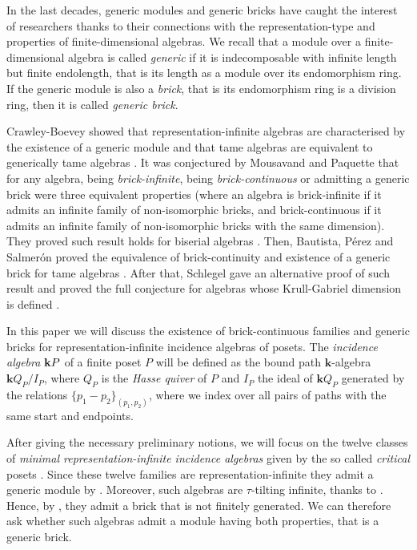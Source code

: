 In the last decades, generic modules and generic bricks have caught the interest of researchers thanks to their connections with the representation-type and properties of finite-dimensional algebras. We recall that a module over a finite-dimensional algebra is called \emph{generic} if it is indecomposable with infinite length but finite endolength, that is its length as a module over its endomorphism ring. If the generic module is also a \emph{brick}, that is its endomorphism ring is a division ring, then it is called \emph{generic brick}.

Crawley-Boevey showed that representation-infinite algebras are characterised by the existence of a generic module \cite[Theorem 4.5]{crawley1991tame} and that tame algebras are equivalent to generically tame algebras \cite[Theorem 4.4]{crawley1991tame}.
It was conjectured by Mousavand and Paquette \cite[Conjecture 4.1]{mousavand2025biserial} that for any algebra, being \emph{brick-infinite}, being \emph{brick-continuous} or admitting a generic brick were three equivalent properties (where an algebra is brick-infinite if it admits an infinite family of non-isomorphic bricks, and brick-continuous if it admits an infinite family of non-isomorphic bricks with the same dimension). They proved such result holds for biserial algebras \cite[Corollary 4.5]{mousavand2025biserial}.
Then, Bautista, Pérez and Salmerón proved the equivalence of brick-continuity and existence of a generic brick for tame algebras \cite[Corollary 1.3]{bau:gen}. After that, Schlegel gave an alternative proof of such result \cite[Theorem 5.6]{schlegel2026infinitetautiltingtheory} and proved the full conjecture for algebras whose Krull-Gabriel dimension is defined \cite[Theorem 5.8]{schlegel2026infinitetautiltingtheory}.\medskip


In this paper we will discuss the existence of brick-continuous families and generic bricks for representation-infinite incidence algebras of posets. The \emph{incidence algebra} $\mathbf{k}{P}$ of a finite poset $P$ will be defined as the bound path $\mathbf{k}$-algebra $\mathbf{k}Q_P/I_P$, where $Q_P$ is the \emph{Hasse quiver} of $P$ and $I_P$ the ideal of $\mathbf{k}Q_P$ generated by the relations $\{p_1 - p_2 \}_{(p_1,p_2)}$, where we index over all pairs of paths with the same start and endpoints.

After giving the necessary preliminary notions, we will focus on the twelve classes of \emph{minimal representation-infinite incidence algebras} given by the so called \emph{critical} posets \cite{lou:ind, lou:repr}.
Since these twelve families are representation-infinite they admit a generic module by \cite[Theorem 4.5]{crawley1991tame}. Moreover, such algebras are $\tau$-tilting infinite, thanks to \cite[Theorem 2.15]{borve:tau}. Hence, by \cite[Theorem 4.14]{sent:brick}, they admit a brick that is not finitely generated. We can therefore ask whether such algebras admit a module having both properties, that is a generic brick.

